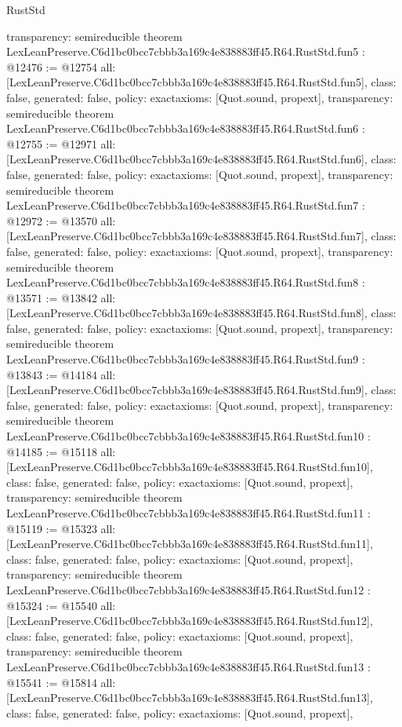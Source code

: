 \begin{lexlean}{RustStd}
\begin{coremodule}
{  transparency: semireducible
}
theorem LexLeanPreserve.C6d1bc0bcc7cbbb3a169c4e838883ff45.R64.RustStd.fun5 : @12476 := @12754 {
  all: [LexLeanPreserve.C6d1bc0bcc7cbbb3a169c4e838883ff45.R64.RustStd.fun5],
  class: false,
  generated: false,
  policy: exact{axioms: [Quot.sound, propext]},
  transparency: semireducible
}
theorem LexLeanPreserve.C6d1bc0bcc7cbbb3a169c4e838883ff45.R64.RustStd.fun6 : @12755 := @12971 {
  all: [LexLeanPreserve.C6d1bc0bcc7cbbb3a169c4e838883ff45.R64.RustStd.fun6],
  class: false,
  generated: false,
  policy: exact{axioms: [Quot.sound, propext]},
  transparency: semireducible
}
theorem LexLeanPreserve.C6d1bc0bcc7cbbb3a169c4e838883ff45.R64.RustStd.fun7 : @12972 := @13570 {
  all: [LexLeanPreserve.C6d1bc0bcc7cbbb3a169c4e838883ff45.R64.RustStd.fun7],
  class: false,
  generated: false,
  policy: exact{axioms: [Quot.sound, propext]},
  transparency: semireducible
}
theorem LexLeanPreserve.C6d1bc0bcc7cbbb3a169c4e838883ff45.R64.RustStd.fun8 : @13571 := @13842 {
  all: [LexLeanPreserve.C6d1bc0bcc7cbbb3a169c4e838883ff45.R64.RustStd.fun8],
  class: false,
  generated: false,
  policy: exact{axioms: [Quot.sound, propext]},
  transparency: semireducible
}
theorem LexLeanPreserve.C6d1bc0bcc7cbbb3a169c4e838883ff45.R64.RustStd.fun9 : @13843 := @14184 {
  all: [LexLeanPreserve.C6d1bc0bcc7cbbb3a169c4e838883ff45.R64.RustStd.fun9],
  class: false,
  generated: false,
  policy: exact{axioms: [Quot.sound, propext]},
  transparency: semireducible
}
theorem LexLeanPreserve.C6d1bc0bcc7cbbb3a169c4e838883ff45.R64.RustStd.fun10 : @14185 := @15118 {
  all: [LexLeanPreserve.C6d1bc0bcc7cbbb3a169c4e838883ff45.R64.RustStd.fun10],
  class: false,
  generated: false,
  policy: exact{axioms: [Quot.sound, propext]},
  transparency: semireducible
}
theorem LexLeanPreserve.C6d1bc0bcc7cbbb3a169c4e838883ff45.R64.RustStd.fun11 : @15119 := @15323 {
  all: [LexLeanPreserve.C6d1bc0bcc7cbbb3a169c4e838883ff45.R64.RustStd.fun11],
  class: false,
  generated: false,
  policy: exact{axioms: [Quot.sound, propext]},
  transparency: semireducible
}
theorem LexLeanPreserve.C6d1bc0bcc7cbbb3a169c4e838883ff45.R64.RustStd.fun12 : @15324 := @15540 {
  all: [LexLeanPreserve.C6d1bc0bcc7cbbb3a169c4e838883ff45.R64.RustStd.fun12],
  class: false,
  generated: false,
  policy: exact{axioms: [Quot.sound, propext]},
  transparency: semireducible
}
theorem LexLeanPreserve.C6d1bc0bcc7cbbb3a169c4e838883ff45.R64.RustStd.fun13 : @15541 := @15814 {
  all: [LexLeanPreserve.C6d1bc0bcc7cbbb3a169c4e838883ff45.R64.RustStd.fun13],
  class: false,
  generated: false,
  policy: exact{axioms: [Quot.sound, propext]},
}
\end{coremodule}
\end{lexlean}
